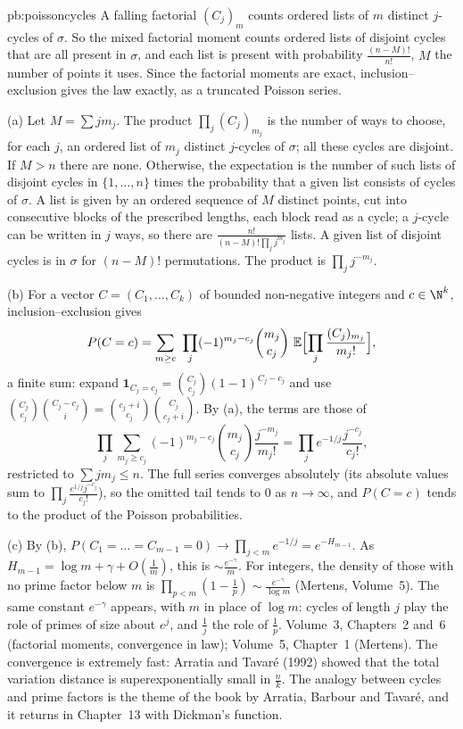 \begin{solution}{pb:poissoncycles}
\idea A falling factorial $(C_j)_m$ counts ordered lists of $m$ distinct $j$-cycles of $\sigma$. So the mixed factorial moment
counts ordered lists of disjoint cycles that are all present in $\sigma$, and each list is present with probability
$\frac{(n-M)!}{n!}$, $M$ the number of points it uses. Since the factorial moments are exact, inclusion--exclusion gives the law
exactly, as a truncated Poisson series.

\writeup (a) Let $M=\sum jm_j$. The product $\prod_j(C_j)_{m_j}$ is the number of ways to choose, for each $j$, an ordered list of
$m_j$ distinct $j$-cycles of $\sigma$; all these cycles are disjoint. If $M>n$ there are none. Otherwise, the expectation is the
number of such lists of disjoint cycles in $\{1,\dots,n\}$ times the probability that a given list consists of cycles of $\sigma$.
A list is given by an ordered sequence of $M$ distinct points, cut into consecutive blocks of the prescribed lengths, each block
read as a cycle; a $j$-cycle can be written in $j$ ways, so there are $\frac{n!}{(n-M)!\prod_jj^{m_j}}$ lists. A given list of
disjoint cycles is in $\sigma$ for $(n-M)!$ permutations. The product is $\prod_jj^{-m_j}$.

(b) For a vector $C=(C_1,\dots,C_k)$ of bounded non-negative integers and $c\in\N^k$, inclusion--exclusion gives
\[
P(C=c)=\sum_{m\ge c}\ \prod_j(-1)^{m_j-c_j}\binom{m_j}{c_j}\ \mathbb E\Bigl[\prod_j\frac{(C_j)_{m_j}}{m_j!}\Bigr],
\]
a finite sum: expand $\mathbf 1_{C_j=c_j}=\binom{C_j}{c_j}(1-1)^{C_j-c_j}$ and use $\binom{C_j}{c_j}\binom{C_j-c_j}{i}=\binom{c_j+i}{c_j}\binom{C_j}{c_j+i}$.
By (a), the terms are those of
\[
\prod_j\sum_{m_j\ge c_j}(-1)^{m_j-c_j}\binom{m_j}{c_j}\frac{j^{-m_j}}{m_j!}=\prod_je^{-1/j}\frac{j^{-c_j}}{c_j!},
\]
restricted to $\sum jm_j\le n$. The full series converges absolutely (its absolute values sum to $\prod_j\frac{e^{1/j}j^{-c_j}}{c_j!}$), so
the omitted tail tends to $0$ as $n\to\infty$, and $P(C=c)$ tends to the product of the Poisson probabilities.

(c) By (b), $P(C_1=\dots=C_{m-1}=0)\to\prod_{j<m}e^{-1/j}=e^{-H_{m-1}}$. As $H_{m-1}=\log m+\gamma+O(\frac1m)$, this is
$\sim\frac{e^{-\gamma}}m$. For integers, the density of those with no prime factor below $m$ is $\prod_{p<m}(1-\frac1p)\sim\frac{e^{-\gamma}}{\log m}$
(Mertens, Volume~5). The same constant $e^{-\gamma}$ appears, with $m$ in place of $\log m$: cycles of length $j$ play the role of primes
of size about $e^j$, and $\frac1j$ the role of $\frac1p$.
\tools Volume~3, Chapters~2 and~6 (factorial moments, convergence in law); Volume~5, Chapter~1 (Mertens).
\leads The convergence is extremely fast: Arratia and Tavaré (1992) showed that the total variation distance is
superexponentially small in $\frac nk$. The analogy between cycles and prime factors is the theme of the book by Arratia, Barbour
and Tavaré, and it returns in Chapter~13 with Dickman's function.
\end{solution}

